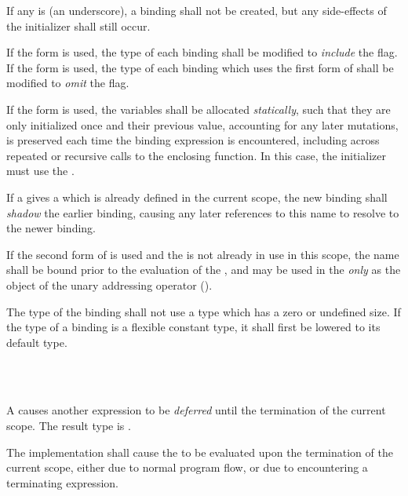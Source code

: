 \specsubsubitem
If any  is \terminal{\_} (an underscore), a binding shall not
be created, but any side-effects of the initializer shall still occur.

\specsubsubitem
If the  form is used, the type of each binding shall be
modified to \textit{include} the  flag. If the 
form is used, the type of each binding which uses the first form of
 shall be modified to \textit{omit} the 
flag.

\specsubsubitem
If the  form is used, the variables shall be allocated
\textit{statically}, such that they are only initialized once and their
previous value, accounting for any later mutations, is preserved each time
the binding expression is encountered, including across repeated or recursive
calls to the enclosing function. In this case, the initializer must use the
.

\specsubsubitem
If a  gives a  which is already defined
in the current scope, the new binding shall \textit{shadow} the earlier
binding, causing any later references to this name to resolve to the newer
binding.

\specsubsubitem
If the second form of  is used and the 
is not already in use in this scope, the name shall be bound prior to the
evaluation of the , and may be used in the
 \textit{only} as the object of the unary addressing
operator (\terminal{\&}).

\specsubsubitem
The type of the binding shall not use a type which has a zero or undefined size.
If the type of a binding is a flexible constant type, it shall first be lowered
to its default type.


\begin{grammar}
 \\
	  \\
\end{grammar}

\specsubsubitem
A  causes another expression to be
\textit{deferred} until the termination of the current scope. The result type
is .

\specsubsubitem
The implementation shall cause the  to be evaluated
upon the termination of the current scope, either due to normal program flow,
or due to encountering a terminating expression.

